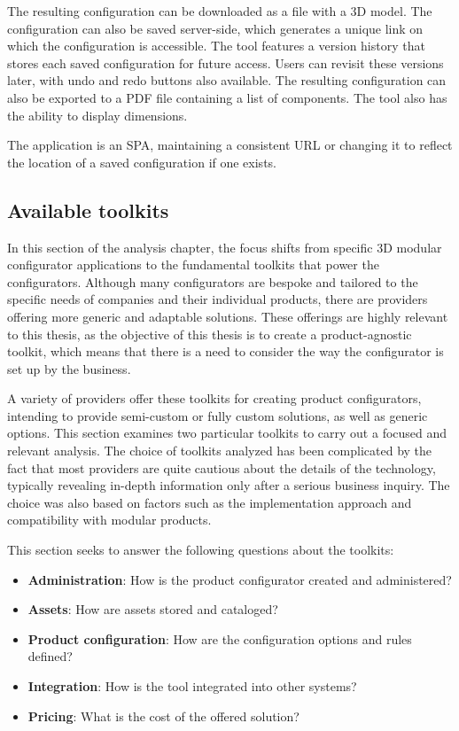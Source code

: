 The resulting configuration can be downloaded as a file with a 3D model. The configuration can also be saved server-side, which generates a unique link on which the configuration is accessible. The tool features a version history that stores each saved configuration for future access. Users can revisit these versions later, with undo and redo buttons also available. The resulting configuration can also be exported to a PDF file containing a list of components. The tool also has the ability to display dimensions.

The application is an SPA, maintaining a consistent URL or changing it to reflect the location of a saved configuration if one exists.


\subsection{Available toolkits}

In this section of the analysis chapter, the focus shifts from specific 3D modular configurator applications to the fundamental toolkits that power the configurators. Although many configurators are bespoke and tailored to the specific needs of companies and their individual products, there are providers offering more generic and adaptable solutions. These offerings are highly relevant to this thesis, as the objective of this thesis is to create a product-agnostic toolkit, which means that there is a need to consider the way the configurator is set up by the business.

A variety of providers offer these toolkits for creating product configurators, intending to provide semi-custom or fully custom solutions, as well as generic options. This section examines two particular toolkits to carry out a focused and relevant analysis. The choice of toolkits analyzed has been complicated by the fact that most providers are quite cautious about the details of the technology, typically revealing in-depth information only after a serious business inquiry. The choice was also based on factors such as the implementation approach and compatibility with modular products.

\noindent This section seeks to answer the following questions about the toolkits: 
\begin{itemize}
    \item \textbf{Administration}: How is the product configurator created and administered?
    \item \textbf{Assets}: How are assets stored and cataloged?
    \item \textbf{Product configuration}: How are the configuration options and rules defined?
    \item \textbf{Integration}: How is the tool integrated into other systems?
    \item \textbf{Pricing}: What is the cost of the offered solution?
\end{itemize}
